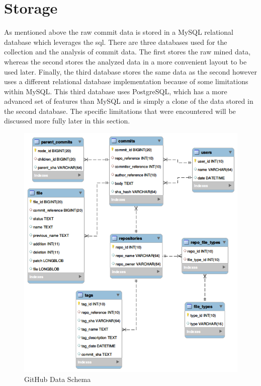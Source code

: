 
\section{Storage}
\label{sec:storage}

As mentioned above the raw commit data is stored in a MySQL relational database which leverages the \gls{sql}. There are three databases used for the collection and the analysis of commit data. The first stores the raw mined data, whereas the second stores the analyzed data in a more convenient layout to be used later. Finally, the third database stores the same data as the second however uses a different relational database implementation because of some limitations within MySQL. This third database uses PostgreSQL, which has a more advanced set of features than MySQL and is simply a clone of the data stored in the second database. The specific limitations that were encountered will be discussed more fully later in this section.

\begin{figure}[!ht]
    \centering
        \includegraphics[width=1.0\textwidth]{images/github_data_schema}
    \caption{GitHub Data Schema}
    \label{fig:github_data_schema}
\end{figure}

